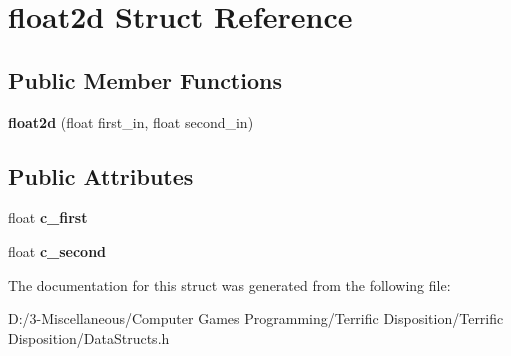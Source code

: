 \hypertarget{structfloat2d}{}\section{float2d Struct Reference}
\label{structfloat2d}
\subsection*{Public Member Functions}
\begin{DoxyCompactItemize}
\item 
\mbox{\label{structfloat2d_ab6bee2acbfe04c07137bbcc298643bc8}} 
{\bfseries float2d} (float first\+\_\+in, float second\+\_\+in)
\end{DoxyCompactItemize}
\subsection*{Public Attributes}
\begin{DoxyCompactItemize}
\item 
\mbox{\label{structfloat2d_a76dc280b57268d69cd46beca41d383d6}} 
float {\bfseries c\+\_\+first}
\item 
\mbox{\label{structfloat2d_a696c05258ec7231a9f090bc63f4e2fdc}} 
float {\bfseries c\+\_\+second}
\end{DoxyCompactItemize}


The documentation for this struct was generated from the following file\+:\begin{DoxyCompactItemize}
\item 
D\+:/3-\/\+Miscellaneous/\+Computer Games Programming/\+Terrific Disposition/\+Terrific Disposition/Data\+Structs.\+h\end{DoxyCompactItemize}
